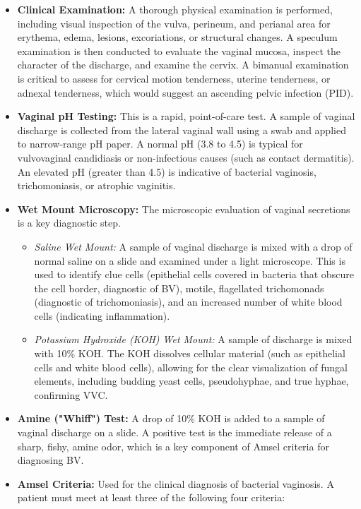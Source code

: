 \begin{itemize}
    \item \textbf{Clinical Examination:} A thorough physical examination is performed, including visual inspection of the vulva, perineum, and perianal area for erythema, edema, lesions, excoriations, or structural changes. A speculum examination is then conducted to evaluate the vaginal mucosa, inspect the character of the discharge, and examine the cervix. A bimanual examination is critical to assess for cervical motion tenderness, uterine tenderness, or adnexal tenderness, which would suggest an ascending pelvic infection (PID).
    \item \textbf{Vaginal pH Testing:} This is a rapid, point-of-care test. A sample of vaginal discharge is collected from the lateral vaginal wall using a swab and applied to narrow-range pH paper. A normal pH (3.8 to 4.5) is typical for vulvovaginal candidiasis or non-infectious causes (such as contact dermatitis). An elevated pH (greater than 4.5) is indicative of bacterial vaginosis, trichomoniasis, or atrophic vaginitis.
    \item \textbf{Wet Mount Microscopy:} The microscopic evaluation of vaginal secretions is a key diagnostic step.
    \begin{itemize}
        \item \textit{Saline Wet Mount:} A sample of vaginal discharge is mixed with a drop of normal saline on a slide and examined under a light microscope. This is used to identify clue cells (epithelial cells covered in bacteria that obscure the cell border, diagnostic of BV), motile, flagellated trichomonads (diagnostic of trichomoniasis), and an increased number of white blood cells (indicating inflammation).
        \item \textit{Potassium Hydroxide (KOH) Wet Mount:} A sample of discharge is mixed with 10\% KOH. The KOH dissolves cellular material (such as epithelial cells and white blood cells), allowing for the clear visualization of fungal elements, including budding yeast cells, pseudohyphae, and true hyphae, confirming VVC.
    \end{itemize}
    \item \textbf{Amine ("Whiff") Test:} A drop of 10\% KOH is added to a sample of vaginal discharge on a slide. A positive test is the immediate release of a sharp, fishy, amine odor, which is a key component of Amsel criteria for diagnosing BV.
    \item \textbf{Amsel Criteria:} Used for the clinical diagnosis of bacterial vaginosis. A patient must meet at least three of the following four criteria:

\end{itemize}
